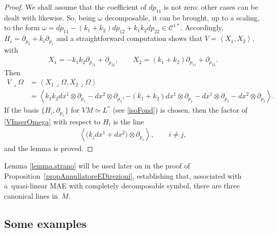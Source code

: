 \documentclass[10pt,a4paper]{amsart}
\newcommand{\C}{\mathcal{C}}
\newcommand{\Span}[1]{\left\langle #1 \right\rangle}
\newcommand{\elle}{H}
\numberwithin{equation}{section}
\begin{document}
\begin{proof}
We shall assume that the coef\/f\/icient of $dp_{11}$ is not zero: other cases can be dealt with likewise. So, being $\omega$ decomposable, it can be brought, up to a scaling, to the form
$\omega=dp_{11}-(k_1+k_2)dp_{12}+k_1k_2dp_{22}\in\C^{1\ast}$.
Accordingly,
$\elle_i=\partial_{p_2}+k_i\partial_{p_1}$
and a straightforward computation shows that
$V=\Span{X_1,X_2}$,
with
\begin{gather}
X_1=-k_1k_2\partial_{p_{11}}+\partial_{p_{22}},\qquad X_2=(k_1+k_2)\partial_{p_{11}}+\partial_{p_{12}}.\label{eqX1X2}
\end{gather}
Then
\begin{align}
V\lrcorner \Omega &=\Span{X_1\lrcorner \Omega,X_2\lrcorner \Omega} \nonumber \\
 &
 =\Span{k_1k_2 dx^1\otimes \partial_{p_1}-dx^2\otimes \partial_{p_2}, -(k_1+k_2)dx^1\otimes \partial_{p_1}-dx^1\otimes \partial_{p_2}-dx^2\otimes \partial_{p_1}} .\label{VInserOmega}
\end{align}
If the basis $\{\elle_i,\partial_{p_1}\}$ for $VM\simeq L^\ast$ (see \eqref{isoFond}) is chosen, then the factor of \eqref{VInserOmega} with respect to $\elle_i$ is the line
\begin{gather}\label{eqLineaFinale}
\Span{\big(k_jdx^1+dx^2\big)\otimes\partial_{p_1}},\qquad i\neq j,
\end{gather}
and the lemma is proved.
\end{proof}

Lemma \ref{lemma.strano} will be used later on in the proof of Proposition~\ref{propAnnullatoreEDirezioni}, establishing that,
associated with a~quasi-linear MAE with completely decomposable symbol, there are three canonical lines in~$M$.

\subsection{Some examples}\label{exEqQL}
\end{document}
